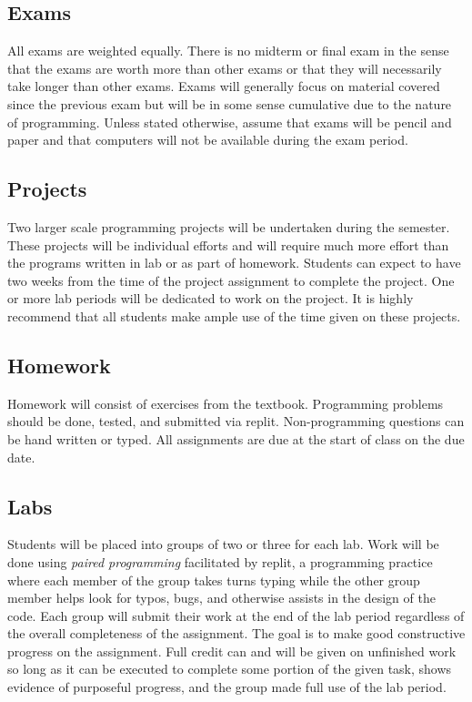 \documentclass[10pt]{article}
\begin{document}
\subsection*{Exams}

All exams are weighted equally. There is no midterm or final exam in the sense that the exams are worth more than other exams or that they will necessarily take longer than other exams.  Exams will generally focus on material covered since the previous exam but will be in some sense cumulative due to the nature of programming. Unless stated otherwise, assume that exams will be pencil and paper and that computers will not be available during the exam period.

\subsection*{Projects}

Two larger scale programming projects will be undertaken during the semester. These projects will be individual efforts and will require much more effort than the programs written in lab or as part of homework. Students can expect to have two weeks from the time of the project assignment to complete the project. One or more lab periods will be dedicated to work on the project. It is highly recommend that all students make ample use of the time given on these projects.

\subsection*{Homework}

Homework will consist of exercises from the textbook. Programming problems should be done, tested, and submitted via replit. Non-programming questions can be hand written or typed. All assignments are due at the start of class on the due date.

\subsection*{Labs}

Students will be placed into groups of two or three for each lab. Work will be done using \textit{paired programming} facilitated by replit, a programming practice where each member of the group takes turns typing while the other group member helps look for typos, bugs, and otherwise assists in the design of the code. Each group will submit their work at the end of the lab period regardless of the overall completeness of the assignment. The goal is to make good constructive progress on the assignment. Full credit can and will be given on unfinished work so long as it can be executed to complete some portion of the given task, shows evidence of purposeful progress, and the group made full use of the lab period.
\end{document}
